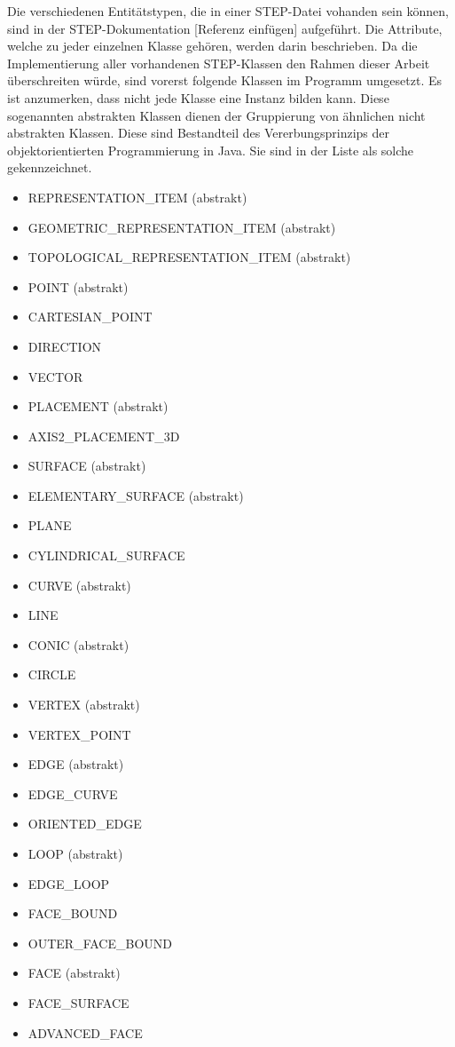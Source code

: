 Die verschiedenen Entitätstypen, die in einer STEP-Datei vohanden sein können, sind in der STEP-Dokumentation [Referenz einfügen] aufgeführt. Die Attribute, welche zu jeder einzelnen Klasse gehören, werden darin beschrieben.
Da die Implementierung aller vorhandenen STEP-Klassen den Rahmen dieser Arbeit überschreiten würde, sind vorerst folgende Klassen im Programm umgesetzt. Es ist anzumerken, dass nicht jede Klasse eine Instanz bilden kann. Diese sogenannten abstrakten Klassen dienen der Gruppierung von ähnlichen nicht abstrakten Klassen. Diese sind Bestandteil des Vererbungsprinzips der objektorientierten Programmierung in Java. Sie sind in der Liste als solche gekennzeichnet.  
\begin{itemize}
	\item REPRESENTATION\_ITEM (abstrakt)
	\item GEOMETRIC\_REPRESENTATION\_ITEM (abstrakt)
	\item TOPOLOGICAL\_REPRESENTATION\_ITEM (abstrakt)
	\item POINT (abstrakt)
	\item CARTESIAN\_POINT
	\item DIRECTION
	\item VECTOR
	\item PLACEMENT (abstrakt)
	\item AXIS2\_PLACEMENT\_3D
	\item SURFACE (abstrakt)
	\item ELEMENTARY\_SURFACE (abstrakt)
	\item PLANE
	\item CYLINDRICAL\_SURFACE	
	\item CURVE (abstrakt)
	\item LINE
	\item CONIC (abstrakt)
	\item CIRCLE 
	\item VERTEX (abstrakt)
	\item VERTEX\_POINT
	\item EDGE (abstrakt)
	\item EDGE\_CURVE
	\item ORIENTED\_EDGE
	\item LOOP (abstrakt)
	\item EDGE\_LOOP
	\item FACE\_BOUND
	\item OUTER\_FACE\_BOUND
	\item FACE (abstrakt)
	\item FACE\_SURFACE
	\item ADVANCED\_FACE
\end{itemize}

